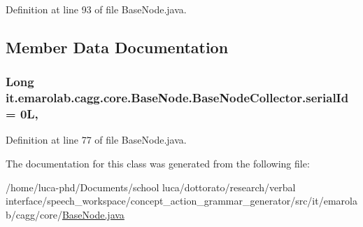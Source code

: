 Definition at line 93 of file Base\-Node.\-java.



\subsection{Member Data Documentation}
\hypertarget{classit_1_1emarolab_1_1cagg_1_1core_1_1BaseNode_1_1BaseNodeCollector_a22a3230c0f09d9157b22e6d1b0ef75ba}{
\subsubsection[{serial\-Id}]{\setlength{\rightskip}{0pt plus 5cm}Long it.\-emarolab.\-cagg.\-core.\-Base\-Node.\-Base\-Node\-Collector.\-serial\-Id = 0\-L\hspace{0.3cm}{\ttfamily [static]}, {\ttfamily [private]}}}\label{classit_1_1emarolab_1_1cagg_1_1core_1_1BaseNode_1_1BaseNodeCollector_a22a3230c0f09d9157b22e6d1b0ef75ba}


Definition at line 77 of file Base\-Node.\-java.



The documentation for this class was generated from the following file\-:\begin{DoxyCompactItemize}
\item 
/home/luca-\/phd/\-Documents/school luca/dottorato/research/verbal interface/speech\-\_\-workspace/concept\-\_\-action\-\_\-grammar\-\_\-generator/src/it/emarolab/cagg/core/\hyperlink{BaseNode_8java}{Base\-Node.\-java}\end{DoxyCompactItemize}
